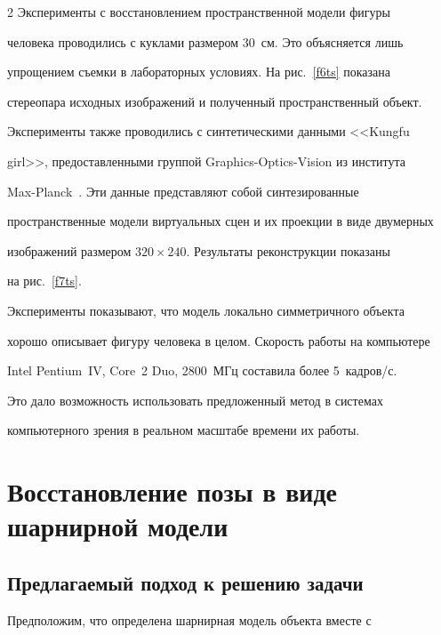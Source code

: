 \begin{multicols}{2}
     Эксперименты с восстановлением пространственной модели фигуры 

человека проводились с куклами размером 30~см. Это объясняется лишь\linebreak 

упрощением съемки в лабораторных условиях. На рис.~\ref{f6ts} показана 

стереопара исходных изоб\-ра\-же\-ний и полученный пространственный объект. 

Эксперименты также проводились с синтетическими данными <<Kungfu 

girl>>, предоставленными группой Graphics-Optics-Vision из института\linebreak 

     Max-Planck~\cite{6ts}. Эти данные представляют собой синтезированные 

пространственные модели виртуальных сцен и их проекции в виде двумерных 

изоб\-ра\-же\-ний размером $320\times 240$. Результаты реконструкции показаны 

на рис.~\ref{f7ts}.







     Эксперименты показывают, что модель локально симметричного объекта 

хорошо описывает фигуру человека в целом. Скорость работы на компьютере 

Intel Pentium~IV, Core~2 Duo, 2800~МГц составила более 5~кадров/с. 

Это дало возможность использовать предложенный метод в системах 

компьютерного зрения в реальном масштабе времени их работы. 

     



\section{Восстановление позы в виде шарнирной модели }



\subsection{Предлагаемый подход к решению задачи} %

     

     Предположим, что определена шарнирная модель объекта вместе с 


\end{multicols}
